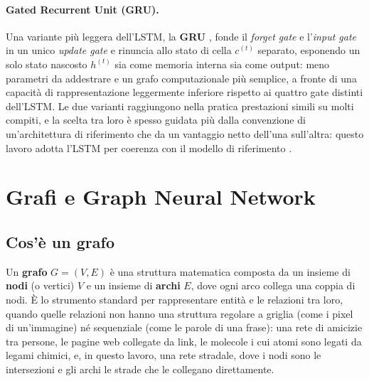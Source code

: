 \paragraph{Gated Recurrent Unit (GRU).} Una variante più leggera dell'LSTM,
la \textbf{GRU} \citep{cho2014gru}, fonde il \emph{forget gate} e
l'\emph{input gate} in un unico \emph{update gate} e rinuncia allo stato di
cella $c^{(t)}$ separato, esponendo un solo stato nascosto $h^{(t)}$ sia
come memoria interna sia come output: meno parametri da addestrare e un
grafo computazionale più semplice, a fronte di una capacità di
rappresentazione leggermente inferiore rispetto ai quattro gate distinti
dell'LSTM. Le due varianti raggiungono nella pratica prestazioni simili su
molti compiti, e la scelta tra loro è spesso guidata più dalla
convenzione di un'architettura di riferimento che da un vantaggio netto
dell'una sull'altra: questo lavoro adotta l'LSTM per coerenza con il
modello di riferimento \citep{wang2022metastgat}.

\section{Grafi e Graph Neural Network}
\label{sec:background-gnn}

\subsection{Cos'è un grafo}

Un \textbf{grafo} $G = (V, E)$ è una struttura matematica composta da un
insieme di \textbf{nodi} (o vertici) $V$ e un insieme di \textbf{archi}
$E$, dove ogni arco collega una coppia di nodi. È lo strumento standard
per rappresentare entità e le relazioni tra loro, quando quelle relazioni
non hanno una struttura regolare a griglia (come i pixel di un'immagine) né
sequenziale (come le parole di una frase): una rete di amicizie tra
persone, le pagine web collegate da link, le molecole i cui atomi sono
legati da legami chimici, e, in questo lavoro, una rete stradale, dove i
nodi sono le intersezioni e gli archi le strade che le collegano
direttamente.

